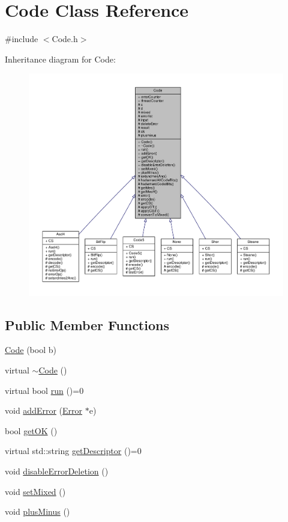 \hypertarget{class_code}{}\section{Code Class Reference}
\label{class_code}


{\ttfamily \#include $<$Code.\+h$>$}



Inheritance diagram for Code\+:
\nopagebreak
\begin{figure}[H]
\begin{center}
\leavevmode
\includegraphics[width=350pt]{class_code__inherit__graph}
\end{center}
\end{figure}
\subsection*{Public Member Functions}
\begin{DoxyCompactItemize}
\item 
\hyperlink{class_code_ac37d2241363b2bfcd11db0e02d3acad6}{Code} (bool b)
\item 
virtual \hyperlink{class_code_ad9a1e323c3ed4d36aeff17faffe1e770}{$\sim$\+Code} ()
\item 
virtual bool \hyperlink{class_code_a5621bbd050948ba1e41f69f451a05990}{run} ()=0
\item 
void \hyperlink{class_code_a79f6282eeac2d8c2d61bab55ddf2e797}{add\+Error} (\hyperlink{class_error}{Error} $\ast$e)
\item 
bool \hyperlink{class_code_a6a7ff74d4db8bc010c750afa1f1743c1}{get\+OK} ()
\item 
virtual std\+::string \hyperlink{class_code_a60db2f615a7cff76e3ece1c486b2fd16}{get\+Descriptor} ()=0
\item 
void \hyperlink{class_code_a58a0c6a1b046c6d20703d32c6a7fefbc}{disable\+Error\+Deletion} ()
\item 
void \hyperlink{class_code_a85f5a2e8133b68173334f24d66f4d5a9}{set\+Mixed} ()
\item 
void \hyperlink{class_code_ac4248e25a1ca509c128ec236be57c946}{plus\+Minus} ()
\end{DoxyCompactItemize}
